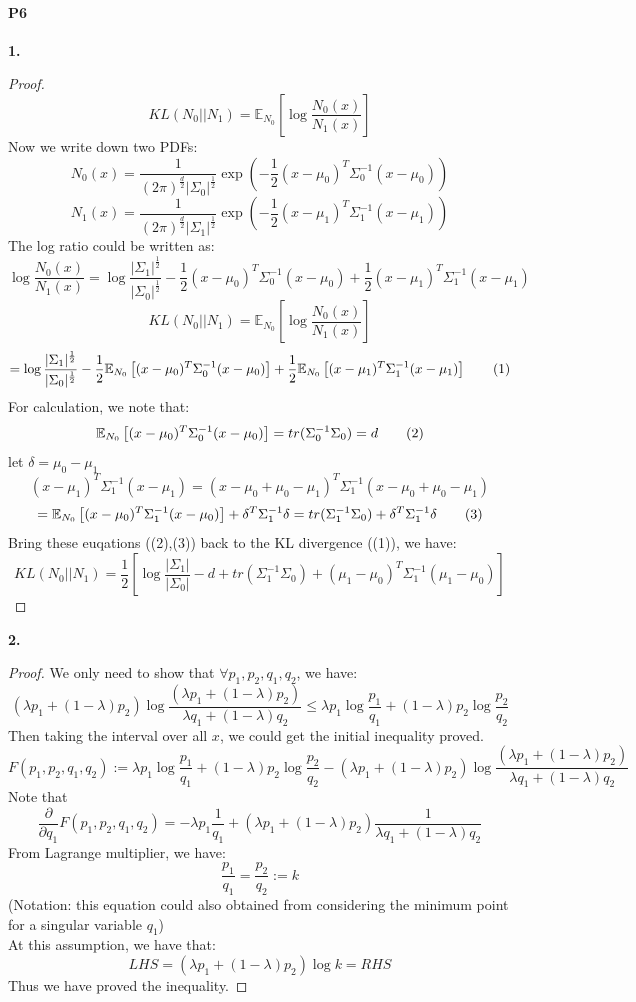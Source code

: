 \documentclass[a4 paper,12pt]{article}
\theoremstyle{definitionstyle}
\newcommand\numberthis{\addtocounter{equation}{1}\tag{\theequation}}
\begin{document}
\paragraph{P6} 
\textbf{1.}
\begin{proof}
\[
  KL(N_0||N_1)=\mathbb{E}_{N_0}\left[\log\frac{N_0(x)}{N_1(x)}\right]
\]
Now we write down two PDFs:
\[
  N_0(x)=\frac{1}{(2\pi)^{\frac{d}{2}}|\Sigma_0|^{\frac{1}{2}}}\exp\left(-\frac{1}{2}(x-\mu_0)^T\Sigma_0^{-1}(x-\mu_0)\right)
\]
\[
  N_1(x)=\frac{1}{(2\pi)^{\frac{d}{2}}|\Sigma_1|^{\frac{1}{2}}}\exp\left(-\frac{1}{2}(x-\mu_1)^T\Sigma_1^{-1}(x-\mu_1)\right)
\]
The log ratio could be written as:
\[
  \log\frac{N_0(x)}{N_1(x)}=\log\frac{|\Sigma_1|^{\frac{1}{2}}}{|\Sigma_0|^{\frac{1}{2}}}-\frac{1}{2}(x-\mu_0)^T\Sigma_0^{-1}(x-\mu_0)+\frac{1}{2}(x-\mu_1)^T\Sigma_1^{-1}(x-\mu_1)
\]
\[
  KL(N_0||N_1)=\mathbb{E}_{N_0}\left[\log\frac{N_0(x)}{N_1(x)}\right]
\]
\[
  =\log\frac{|\Sigma_1|^{\frac{1}{2}}}{|\Sigma_0|^{\frac{1}{2}}}-\frac{1}{2}\mathbb{E}_{N_0}\left[(x-\mu_0)^T\Sigma_0^{-1}(x-\mu_0)\right]+\frac{1}{2}\mathbb{E}_{N_0}\left[(x-\mu_1)^T\Sigma_1^{-1}(x-\mu_1)\right] \numberthis
\]
For calculation, we note that:
\[
  \mathbb{E}_{N_0}\left[(x-\mu_0)^T\Sigma_0^{-1}(x-\mu_0)\right]=tr(\Sigma_0^{-1}\Sigma_0)=d \numberthis
\]
let $\delta=\mu_0-\mu_1$
\[
  (x-\mu_1)^T\Sigma_1^{-1}(x-\mu_1)=(x-\mu_0+\mu_0-\mu_1)^T\Sigma_1^{-1}(x-\mu_0+\mu_0-\mu_1)
\]
\[
  =\mathbb{E}_{N_0}\left[(x-\mu_0)^T\Sigma_1^{-1}(x-\mu_0)\right]+\delta^T\Sigma_1^{-1}\delta=tr(\Sigma_1^{-1}\Sigma_0)+\delta^T\Sigma_1^{-1}\delta \numberthis
\]
Bring these euqations ((2),(3)) back to the KL divergence ((1)), we have:
\[
  KL(N_0||N_1)=\frac{1}{2}\left[\log\frac{|\Sigma_1|}{|\Sigma_0|}-d+tr(\Sigma_1^{-1}\Sigma_0)+(\mu_1-\mu_0)^T\Sigma_1^{-1}(\mu_1-\mu_0)\right] 
\]
\end{proof}
\textbf{2.} 
\begin{proof}
We only need to show that $\forall p_1,p_2,q_1,q_2$, we have:
\[
  \left(\lambda p_1+(1-\lambda)p_2\right)\log\frac{\left(\lambda p_1+(1-\lambda)p_2\right)}{\lambda q_1+(1-\lambda)q_2}\le\lambda p_1\log\frac{p_1}{q_1}+(1-\lambda)p_2\log\frac{p_2}{q_2}
\]
Then taking the interval over all $x$, we could get the initial inequality proved.\\
\[
  F(p_1,p_2,q_1,q_2):=\lambda p_1\log\frac{p_1}{q_1}+(1-\lambda)p_2\log\frac{p_2}{q_2}-\left(\lambda p_1+(1-\lambda)p_2\right)\log\frac{\left(\lambda p_1+(1-\lambda)p_2\right)}{\lambda q_1+(1-\lambda)q_2}
\]
Note that 
\[
  \frac{\partial}{\partial q_1}F(p_1,p_2,q_1,q_2)=-\lambda p_1\frac{1}{q_1}+\left(\lambda p_1+(1-\lambda)p_2\right)\frac{1}{\lambda q_1+(1-\lambda)q_2}
\]
From Lagrange multiplier, we have:
\[
  \frac{p_1}{q_1}=\frac{p_2}{q_2}:=k
\]
(Notation: this equation could also obtained from considering the minimum point for a singular variable $q_1$)\\
At this assumption, we have that:
\[
  LHS=\left(\lambda p_1+(1-\lambda)p_2\right)\log k=RHS
\]
Thus we have proved the inequality.
\end{proof}
\end{document}
